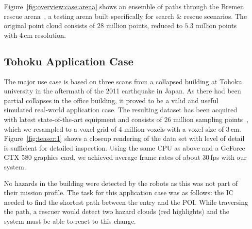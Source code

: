 \documentclass{egpubl}
\begin{document}
 Figure~\ref{fig:overview:case:arena} shows an ensemble of paths through the Bremen rescue arena~\cite{varsadan08}, a testing arena built specifically for search \& rescue scenarios. The original point cloud consists of $28$ million points, reduced to $5.3$ million points with 4\,cm resolution.

\subsection{Tohoku Application Case} \label{sec:results:applicationcase}

The major use case is based on three scans from a collapsed building at Tohoku university in the aftermath of the 2011 earthquake in Japan. As there had been partial collapses in the office building, it proved to be a valid and useful simulated real-world application case. The resulting dataset has been acquired with latest state-of-the-art equipment and consists of $26$ million sampling points~\cite{journals/jfr/NagataniKOOYTNYKFK13}, which we resampled to a voxel grid of $4$ million voxels with a voxel size of 3\,cm. Figure~\ref{fig:teaser:1} shows a closeup rendering of the data set with level of detail is sufficient for detailed inspection. Using the same CPU as above and a GeForce GTX 580 graphics card, we achieved average frame rates of about 30\,fps with our system.

No hazards in the building were detected by the robots as this was not part of their mission profile. The task for this application case was as follows: the IC needed to find the shortest path between the entry and the POI. While traversing the path, a rescuer would detect two hazard clouds (red highlights) and the system must be able to react to this change.
\end{document}
